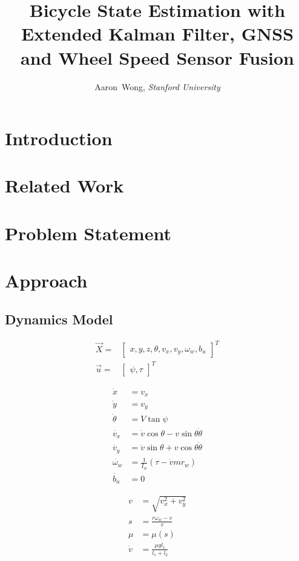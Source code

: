 \documentclass[letterpaper,times]{IONconf}
\title{Bicycle State Estimation with Extended Kalman Filter, GNSS and Wheel Speed Sensor Fusion}
\author{
    Aaron~Wong, \textit{Stanford University}%
    }
\begin{document}
\maketitle

\section{Introduction}

\section{Related Work}

\section{Problem Statement}

\section{Approach}

\subsection{Dynamics Model}

\begin{align*}
    \vec{X} =& \begin{bmatrix}
        x, y, z, \theta , v_x,v_y, \omega_w , b_u
    \end{bmatrix}^T\\
    \vec{u} =& \begin{bmatrix}
        \psi, \tau 
    \end{bmatrix}^T
\end{align*}

\begin{align*}
    \dot{x} &= v_x\\
    \dot{y} &= v_y\\
    \dot{\theta } &= V \tan{\psi}\\
    \dot{v_x} &= \dot{v}\cos{\theta} - v \sin{\theta} \dot{\theta}\\
    \dot{v_y} &= \dot{v}\sin{\theta} + v\cos{\theta} \dot{\theta}\\
    \dot{\omega_w} &= \frac{ 1}{I_w }(\tau - \dot{v}mr_w)\\
    \dot{b_u} &= 0
\end{align*}

\begin{align*}
    v &= \sqrt{ v_x^2 + v_y^2}\\
    s &= \frac{ r \omega_w-v}{v }\\
    \mu &= \mu(s)\\
    \dot{v} &= \frac{ \mu g l_1}{l_1+l_2 }\\
\end{align*}
\end{document}
